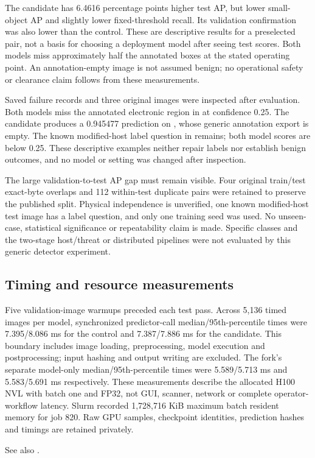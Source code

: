 The candidate has 6.4616 percentage points higher test AP, but lower small-object
AP and slightly lower fixed-threshold recall. Its validation confirmation was
also lower than the control. These are descriptive results for a preselected
pair, not a basis for choosing a deployment model after seeing test scores.
Both models miss approximately half the annotated boxes at the stated operating
point. An annotation-empty image is not assumed benign; no operational safety
or clearance claim follows from these measurements.

Saved failure records and three original images were inspected after evaluation.
Both models miss the annotated electronic region in  at
confidence 0.25. The candidate produces a 0.945477 prediction on
, whose generic annotation export is empty. The known
modified-host label question in  remains; both model scores
are below 0.25. These descriptive examples neither repair labels nor establish
benign outcomes, and no model or setting was changed after inspection.

The large validation-to-test AP gap must remain visible. Four original
train/test exact-byte overlaps and 112 within-test duplicate pairs were retained
to preserve the published split. Physical independence is unverified, one known
modified-host test image has a label question, and only one training seed was
used. No unseen-case, statistical significance or repeatability claim is made.
Specific classes and the two-stage host/threat or distributed pipelines were
not evaluated by this generic detector experiment.

\subsection{Timing and resource measurements}
Five validation-image warmups preceded each test pass. Across 5,136 timed images
per model, synchronized predictor-call median/95th-percentile times were
7.395/8.086 ms for the control and 7.387/7.886 ms for the candidate. This boundary
includes image loading, preprocessing, model execution and postprocessing;
input hashing and output writing are excluded. The fork's separate model-only
median/95th-percentile times were 5.589/5.713 ms and 5.583/5.691 ms respectively.
These measurements describe the allocated H100 NVL with batch one and FP32,
not GUI, scanner, network or complete operator-workflow latency. Slurm recorded
1,728,716 KiB maximum batch resident memory for job 820. Raw GPU samples,
checkpoint identities, prediction hashes and timings are retained privately.
\par{} See also .
